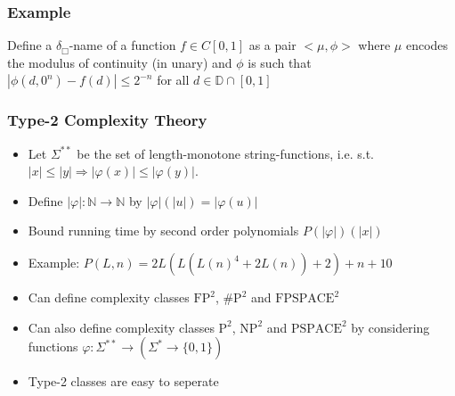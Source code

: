 \documentclass[xcolor=pdftex,dvipsnames,table]{beamer}
\newcommand{\N}{\ensuremath{\mathbb{N}}}
\newcommand{\D}{\ensuremath{\mathbb{D}}}
\newcommand{\sigmas}{\ensuremath{\Sigma^{**}}}
\newcommand{\abs}[1]{\left|#1\right|}
\newcommand{\fpt}{\ensuremath{\text{FP}^2}\xspace}
\newcommand{\fpspacet}{\ensuremath{\text{FPSPACE}^2}\xspace}
\newcommand{\sharpt}{\ensuremath{\text{\#P}^2}\xspace}
\newcommand{\pt}{\ensuremath{\text{P}^2}\xspace}
\newcommand{\npt}{\ensuremath{\text{NP}^2}\xspace}
\newcommand{\pspacet}{\ensuremath{\text{PSPACE}^2}\xspace}
\begin{document}
\begin{frame}
  \frametitle{Example}
  Define a $\delta_\Box$-name of a function $f \in C[0,1]$ as a pair $<\mu, \phi>$ where $\mu$ encodes the modulus of continuity (in unary) and $\phi$ is such that $\abs{\phi(d, 0^n)-f(d)} \leq 2^{-n}$ for all $d \in \D \cap [0,1]$

		\begin{figure}
		\centering
    \vfill
		\end{figure}
                
  \end{frame}
\begin{frame}
  \frametitle{Type-2 Complexity Theory}
  \begin{itemize}
  \item Let $\sigmas$ be the set of length-monotone string-functions, i.e. s.t. $\abs{x} \leq \abs{y} \Rightarrow \abs{\varphi(x)} \leq \abs{\varphi(y)}$.
  \item Define $\abs{\varphi} : \N \to \N$ by $\abs{\varphi}(\abs{u}) = \abs{\varphi(u)}$
   \item Bound running time by second order polynomials $P(\abs{\varphi})(\abs{x})$
   \item Example: $P(L,n) = 2L(L(L(n)^4+2L(n))+2)+n+10$
   \item  Can define complexity classes \fpt, \sharpt and \fpspacet 
   \item  Can also define complexity classes \pt, \npt and \pspacet by considering functions $\varphi : \sigmas \to (\Sigma^* \to \{0,1\})$
     \item Type-2 classes are easy to seperate
  
  \end{itemize}
\end{frame}
\end{document}
